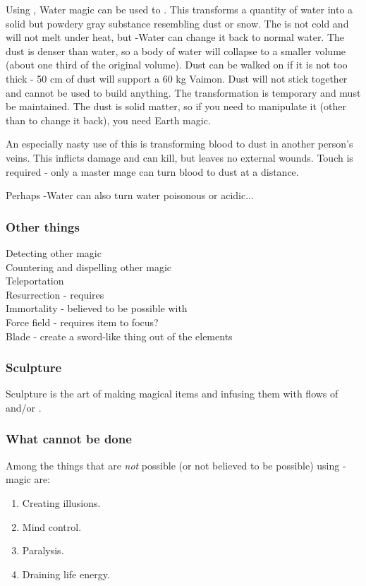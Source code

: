 Using \Itzach{}, Water magic can be used to . This transforms a quantity of water into a solid but powdery gray substance resembling dust or snow. The  is not cold and will not melt under heat, but \Iquin{}-Water can change it back to normal water. The dust is denser than water, so a body of water will collapse to a smaller volume (about one third of the original volume). Dust can be walked on if it is not too thick - 50 cm of dust will support a 60 kg Vaimon. Dust will not stick together and cannot be used to build anything. The transformation is temporary and must be maintained. The dust is solid matter, so if you need to manipulate it (other than to change it back), you need Earth magic. 

An especially nasty use of this is transforming blood to dust in another person's veins. This inflicts damage and can kill, but leaves no external wounds. Touch is required - only a master mage can turn blood to dust at a distance. 

Perhaps \Itzach{}-Water can also turn water poisonous or acidic... 



\subsubsection{Other things}
Detecting other magic \\
Countering and dispelling other magic \\
Teleportation \\
Resurrection - requires \Itzach{} \\
Immortality - believed to be possible with \Itzach{} \\
Force field - requires item to focus? \\
Blade - create a sword-like thing out of the elements \\



\subsubsection{Sculpture}
Sculpture is the art of making magical items and infusing them with flows of \Iquin{} and/or \Itzach{}. 



\subsubsection{What cannot be done}
Among the things that are \emph{not} possible (or not believed to be possible) using \Iquin{}-\Itzach{} magic are:

\begin{enumerate}
	\item Creating illusions. 
	\item Mind control. 
	\item Paralysis. 
	\item Draining life energy. 
\end{enumerate}




